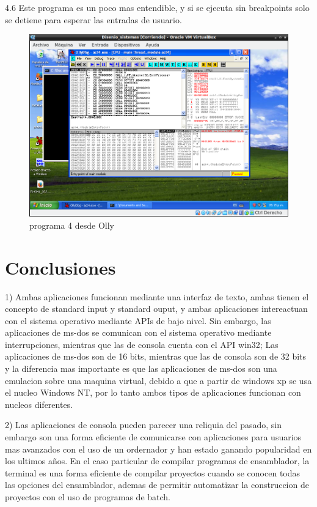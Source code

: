 \large{4.6} Este programa es un poco mas entendible, y si se ejecuta sin breakpoints solo se detiene para esperar las entradas de usuario.
\begin{figure}[H]
  \includegraphics[width=\linewidth]{practica2/imagenes/ej4/olly_ej4.png}
  \caption{programa 4 desde Olly}
\end{figure}


\section{Conclusiones}
1) Ambas aplicaciones funcionan mediante una interfaz de texto, ambas tienen el concepto de standard input y standard ouput, y ambas aplicaciones intereactuan con el sistema operativo mediante APIs de bajo nivel. Sin embargo, las aplicaciones de ms-dos se comunican con el sistema operativo mediante interrupciones, mientras que las de consola cuenta con el API win32; Las aplicaciones de ms-dos son de 16 bits, mientras que las de consola son de 32 bits y la diferencia mas importante es que las aplicaciones de ms-dos son una emulacion sobre una maquina virtual, debido a que a partir de windows xp se usa el nucleo Windows NT, por lo tanto ambos tipos de aplicaciones funcionan con nucleos diferentes.


2) Las aplicaciones de consola pueden parecer una reliquia del pasado, sin embargo son una forma eficiente de comunicarse con aplicaciones para usuarios mas avanzados con el uso de un ordernador y han estado ganando popularidad en los ultimos años. En el caso particular de compilar programas de ensamblador, la terminal es una forma eficiente de compilar proyectos cuando se conocen todas las opciones del ensamblador, ademas de permitir automatizar la construccion de proyectos con el uso de programas de batch.